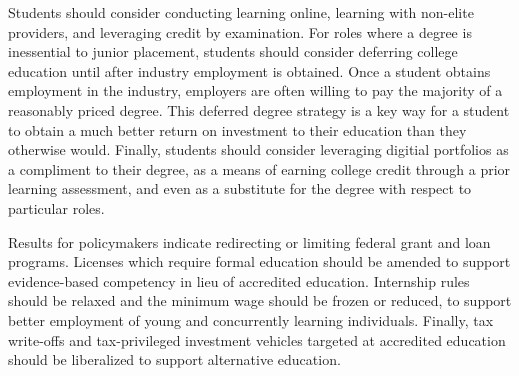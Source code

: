 \documentclass[AER]{./aea-latex-templates/AEA}
\begin{document}
Students should consider conducting learning online, learning with non-elite providers,
and leveraging credit by examination.
For roles where a degree is inessential to junior placement, students should consider
deferring college education until after industry employment is obtained.
Once a student obtains employment in the industry, employers are often willing to pay the majority of a reasonably priced degree.
This deferred degree strategy is a key way for a student to obtain a much better return on investment to their education than they otherwise would.
Finally, students should consider leveraging digitial portfolios as a compliment to their degree,
as a means of earning college credit through a prior learning assessment,
and even as a substitute for the degree with respect to particular roles.

Results for policymakers indicate redirecting or limiting federal grant and loan programs.
Licenses which require formal education should be amended to support evidence-based competency in lieu of accredited education.
Internship rules should be relaxed and the minimum wage should be frozen or reduced,
to support better employment of young and concurrently learning individuals.
Finally, tax write-offs and tax-privileged
investment vehicles targeted at accredited education should be liberalized
to support alternative education.



\end{document}
